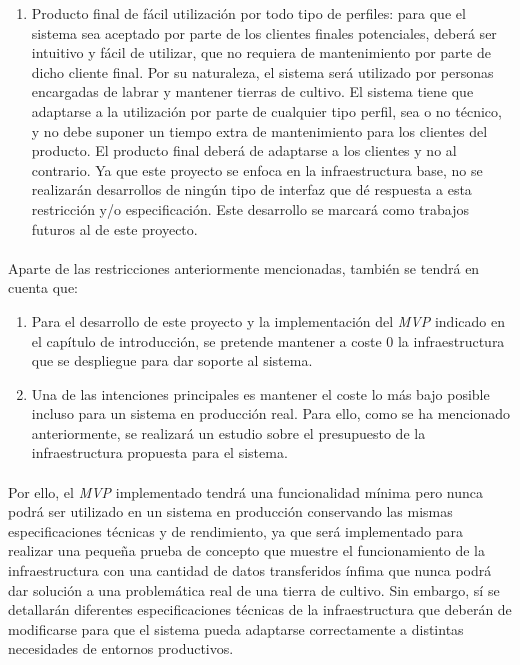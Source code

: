 \documentclass[../../memoria.tex]{subfiles}
\begin{document}
\begin{enumerate}
    \item Producto final de fácil utilización por todo tipo de perfiles: para que el sistema sea aceptado por parte de los clientes finales potenciales, deberá ser intuitivo y fácil de utilizar, que no requiera de mantenimiento por parte de dicho cliente final. Por su naturaleza, el sistema será utilizado por personas encargadas de labrar y mantener tierras de cultivo. El sistema tiene que adaptarse a la utilización por parte de cualquier tipo perfil, sea o no técnico, y no debe suponer un tiempo extra de mantenimiento para los clientes del producto. El producto final deberá de adaptarse a los clientes y no al contrario. Ya que este proyecto se enfoca en la infraestructura base, no se realizarán desarrollos de ningún tipo de interfaz que dé respuesta a esta restricción y/o especificación. Este desarrollo se marcará como trabajos futuros al de este proyecto.

\end{enumerate}

\paragraph{}
Aparte de las restricciones anteriormente mencionadas, también se tendrá en cuenta que:

\begin{enumerate}
    \item Para el desarrollo de este proyecto y la implementación del \textit{MVP} indicado en el capítulo de introducción, se pretende mantener a coste 0 la infraestructura que se despliegue para dar soporte al sistema.

    \item Una de las intenciones principales es mantener el coste lo más bajo posible incluso para un sistema en producción real. Para ello, como se ha mencionado anteriormente, se realizará un estudio sobre el presupuesto de la infraestructura propuesta para el sistema.
\end{enumerate}

\paragraph{}
Por ello, el \textit{MVP} implementado tendrá una funcionalidad mínima pero nunca podrá ser utilizado en un sistema en producción conservando las mismas especificaciones técnicas y de rendimiento, ya que será implementado para realizar una pequeña prueba de concepto que muestre el funcionamiento de la infraestructura con una cantidad de datos transferidos ínfima que nunca podrá dar solución a una problemática real de una tierra de cultivo. Sin embargo, sí se detallarán diferentes especificaciones técnicas de la infraestructura que deberán de modificarse para que el sistema pueda adaptarse correctamente a distintas necesidades de entornos productivos.
\end{document}

